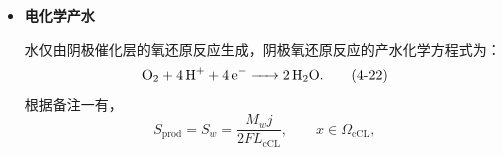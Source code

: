 \documentclass[bwprint]{gmcmthesis}
\numberwithin{figure}{section}
\begin{document}
\begin{itemize}
 设 \(J_v\) 和 \(J_l\) 分别表示水蒸气和液态水沿 \(x\) 方向的质量通量。由于冰被视为静止固相，其宏观质量通量满足 \(J_i = 0\)。

 分别记冷凝、蒸发、冻结、融化、凝华和升华速率为
\[
r_{\text{cond}}, \quad r_{\text{evap}}, \quad r_{\text{frz}}, \quad r_{\text{mlt}}, \quad r_{\text{dep}}, \quad r_{\text{sub}},
\]
单位均为 \(\text{kg m}^{-3}\text{s}^{-1}\)。同时记 \(S_{\text{prod}}\) 为阴极电化学反应产生水的体积源项。

 对三相分别建立质量守恒方程。水蒸气满足
\begin{equation}
\frac{\partial m_v}{\partial t} = -\frac{\partial J_v}{\partial x} - r_{\text{cond}} + r_{\text{evap}} - r_{\text{dep}} + r_{\text{sub}}. \tag{4-17}
\end{equation}

 液态水满足
\begin{equation}
\frac{\partial m_l}{\partial t} = -\frac{\partial J_l}{\partial x} + r_{\text{cond}} - r_{\text{evap}} - r_{\text{frz}} + r_{\text{mlt}} + S_{\text{prod}}. \tag{4-18}
\end{equation}

 固态冰不发生宏观迁移，其质量变化完全来自相变：
\begin{equation}
\frac{\partial m_i}{\partial t} = r_{\text{frz}} - r_{\text{mlt}} + r_{\text{dep}} - r_{\text{sub}}. \tag{4-19}
\end{equation}

 将（4-17）--（4-19）相加，六个内部相变项相互抵消，可得
\begin{equation}
\frac{\partial(m_v + m_l + m_i)}{\partial t} = -\frac{\partial(J_v + J_l)}{\partial x} + S_{\text{prod}}. \tag{4-20}
\end{equation}

 令
\[
N_w = J_v + J_l, \qquad S_w = S_{\text{prod}},
\]
结合（4-11）即有
\begin{equation}
\frac{\partial m_w}{\partial t} = -\frac{\partial N_w}{\partial x} + S_w. \tag{4-21}
\end{equation}

 可见，所建立的三相模型与题目常温模型中的总水守恒方程严格相容，相变只改变水在气、液、固三相之间的分配，并不改变水的总质量。



\item \textbf {电化学产水}

 水仅由阴极催化层的氧还原反应生成，阴极氧还原反应的产水化学方程式为：
\begin{equation}
\ce{O2 + 4H+ + 4e- -> 2H2O}. \tag{4-22}
\end{equation}
根据备注一有，
\begin{equation}
S_{\text{prod}} = S_w = \frac{M_w j}{2F L_{\text{cCL}}}, \qquad x \in \Omega_{\text{cCL}}, \tag{4-23}
\end{equation}


\end{itemize}
\end{document}
